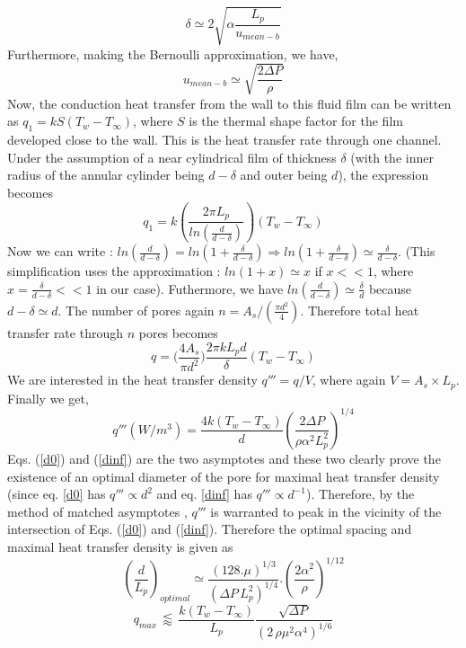 \documentclass[twocolumn,10pt,cleanfoot]{ihmtc}
\begin{document}
\[\delta \simeq 2\sqrt{\alpha \frac{L_p}{u_{mean-b}}}\]
Furthermore, making the Bernoulli approximation, we have,
\[u_{mean-b} \simeq \sqrt{\frac{2\Delta P}{\rho }}\]
Now, the conduction heat transfer from the wall to this fluid film can be written as $ q_1=k S (T_w-T_\infty)$, where $ S $ is the thermal shape factor for the film developed close to the wall. This is the heat transfer rate through one channel. Under the assumption of a near cylindrical film of thickness $\delta$ (with the inner radius of the annular cylinder being $d-\delta$ and outer being $d$), the expression becomes
\[q_1=k \left( \frac{2 \pi L_p}{ln\left(\frac{d}{d-\delta}\right)} \right) (T_w-T_\infty) \]
Now we can write : $ln(\frac{d}{d-\delta})=ln(1+\frac{\delta}{d-\delta}) \Rightarrow ln(1+\frac{\delta}{d-\delta}) \simeq \frac{\delta}{d-\delta}$. (This simplification uses the approximation : $ln(1+x) \simeq x$ if $x<<1$, where $x=\frac{\delta}{d-\delta}<<1$ in our case). Futhermore, we have $ln(\frac{d}{d-\delta})\simeq\frac{\delta}{d}$ because $d-\delta \simeq d$. The number of pores again $n=A_s/(\frac{\pi d^2}{4})$. Therefore total heat transfer rate through $n$ pores becomes
\[q=\biggl( \frac{4 A_s}{\pi d^2}\biggr) \frac{2 \pi k L_p d}{\delta}(T_w-T_\infty)\]
We are interested in the heat transfer density $q''' = q/V$, where again $V=A_s \times L_p$. Finally we get, 
%
\begin{equation}\label{dinf}
q'''(W/m^3)=\frac{4k (T_w-T_\infty)}{d}\left(\frac{2\Delta P}{\rho\alpha^{2}L_{p}^{2}}\right)^{1/4}
\end{equation}
%
Eqs. (\ref{d0}) and (\ref{dinf}) are the two asymptotes and these two clearly prove the existence of an optimal diameter of the pore for maximal heat transfer density (since eq. \ref{d0} has $q''' \propto d^2$ and eq. \ref{dinf} has $q''' \propto d^{-1}$). Therefore, by the method of matched asymptotes \cite{bejan2004declength}, $q'''$ is warranted to peak in the vicinity of the intersection of Eqs. (\ref{d0}) and (\ref{dinf}). Therefore the optimal spacing and maximal heat transfer density is given as 
%
\begin{equation}
\left(\frac{d}{L_{p}}\right)_{optimal} \simeq \frac{\left(128.\mu\right)^{{1}/{3}}}{\left(\Delta P \, L_p^2 \right)^{{1}/{4}}}.\left(\frac{2\alpha^{2}}{\rho}\right)^{{1}/{12}}
\end{equation}
%
\begin{equation}
q_{max}\,  \lessapprox \, \frac{k (T_w-T_\infty)}{L_p}\frac{\sqrt{\Delta P}}{(2\, \rho \mu^2 \alpha^4)^{1/6}}
\end{equation}
\end{document}
